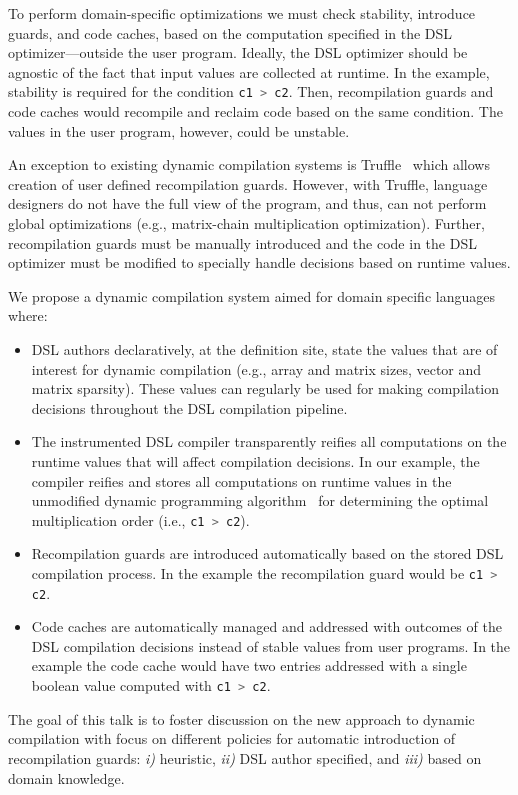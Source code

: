 \documentclass{llncs}
\newcommand{\scode}[1]{\lstinline[language=Scala,columns=fixed,basicstyle=\ttfamily,keywordstyle=\ttfamily]|#1|}
\newcommand{\code}[1]{\scode{#1}}
\begin{document}
 To perform domain-specific optimizations we must check stability, introduce guards, and code caches, based on the
  computation specified in the DSL optimizer---outside the user program. Ideally, the DSL optimizer should be
  agnostic of the fact that input values are collected at runtime. In the example,
  stability is required for the condition \code{c1 > c2}. Then, recompilation guards
  and code caches would recompile and reclaim code based on the same condition. The
  values in the user program, however, could be unstable.

An exception to existing dynamic compilation systems is Truffle~\cite{wurthinger2013one} which allows creation of user defined recompilation guards. However, with Truffle, language designers do not have the full view of the program, and thus, can not perform global optimizations (e.g., matrix-chain multiplication optimization). Further, recompilation guards must be manually introduced and the code in the DSL optimizer must be modified to specially handle decisions based on runtime values.

We propose a dynamic compilation system aimed for domain specific languages where:
\begin{itemize}

  \item DSL authors declaratively, at the definition site, state the values that
    are of interest for dynamic compilation (e.g., array and matrix sizes, vector
    and matrix sparsity). These values can regularly be used for making
    compilation decisions throughout the DSL compilation pipeline.

  \item The instrumented DSL compiler transparently reifies all computations on
   the runtime values that will affect compilation decisions. In our example,
   the compiler reifies and stores all computations on runtime values in the
   unmodified dynamic programming algorithm~\cite{cormen2001introduction} for determining the
   optimal multiplication order (i.e., \code{c1 > c2}).

  \item Recompilation guards are introduced automatically based on the stored DSL
   compilation process. In the example the recompilation guard would be \code{c1 > c2}.

  \item Code caches are automatically managed and addressed with outcomes of the
   DSL compilation decisions instead of stable values from user programs. In the example
   the code cache would have two entries addressed with a single boolean
   value computed with \code{c1 > c2}.

\end{itemize}

The goal of this talk is to foster discussion on the new approach to dynamic compilation with focus on different policies for automatic introduction of recompilation guards:
 \emph{i)} heuristic, \emph{ii)} DSL author specified, and \emph{iii)} based on domain knowledge.



\end{document}
